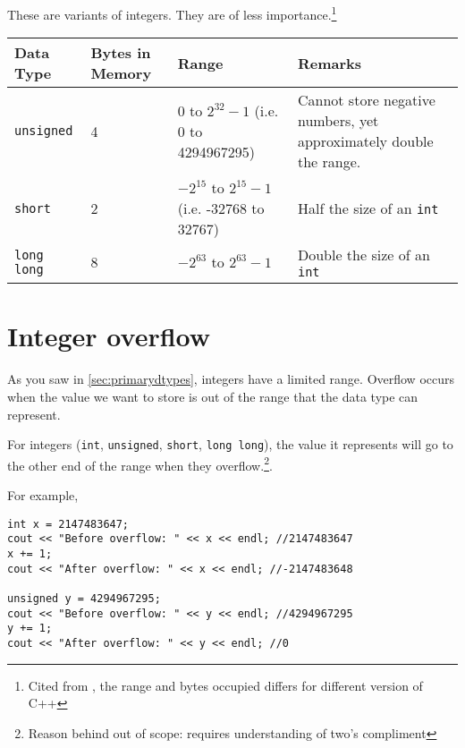 \pagebreak

These are variants of integers. They are of less importance.\footnote{Cited from \cite{cpptypes}, the range and bytes occupied differs for different version of C++}

\begin{table}[h]
    \centering
    \begin{tabular}{|m{6em}|m{6em}|m{10em}|m{12em}|}
        \hline
        \textbf{Data Type} & 
        Bytes in Memory & 
        Range & 
        Remarks 
        \\ \hline \hline
        
        \texttt{unsigned} &
        4 & 
        $0$ to $2^{32}-1$ (i.e. 0 to 4294967295) &
        Cannot store negative numbers, yet approximately double the range.
        \\ \hline
        
        \texttt{short} &
        2 & 
        $-2^{15}$ to $2^{15}-1$ (i.e. -32768 to 32767) &
        Half the size of an \texttt{int}
        \\ \hline
        
        \texttt{long long} &
        8 & 
        $-2^{63}$ to $2^{63}-1$ &
        Double the size of an \texttt{int}
        \\ \hline
        
    \end{tabular}
\end{table}

\section{Integer overflow}

As you saw in \cref{sec:primarydtypes}, integers have a limited range. Overflow occurs when the value we want to store is out of the range that the data type can represent. 

For integers (\texttt{int}, \texttt{unsigned}, \texttt{short}, \texttt{long long}), the value it represents will go to the other end of the range when they overflow.\footnote{Reason behind out of scope: requires understanding of two's compliment}. 

For example,
\begin{lstlisting}
int x = 2147483647;
cout << "Before overflow: " << x << endl; //2147483647
x += 1;
cout << "After overflow: " << x << endl; //-2147483648

unsigned y = 4294967295;
cout << "Before overflow: " << y << endl; //4294967295
y += 1;
cout << "After overflow: " << y << endl; //0
\end{lstlisting}

